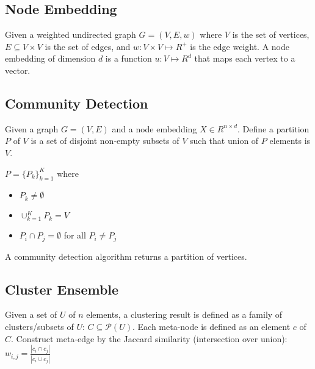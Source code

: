 \subsection{Node Embedding}

\begin{definition}
Given a weighted undirected graph $G = (V, E, w)$ where $V$ is the set of vertices, $E \subseteq V \times V$ is the set of edges, and $w: V \times V \mapsto R^+$ is the edge weight. A node embedding of dimension $d$ is a function $u: V \mapsto R^d$ that maps each vertex to a vector.
\end{definition}



\newpage
\subsection{Community Detection}
\begin{definition}
Given a graph $G = (V, E)$ and a node embedding $X \in R^{n \times d}$. Define a partition $P$ of $V$ is a set of disjoint non-empty subsets of $V$ such that union of $P$ elements is $V$.

$P = \{P_k\}_{k=1}^{K}$ where
\begin{itemize}
\item $P_k \neq \emptyset$
\item $\cup_{k=1}^{K} P_k = V$
\item $P_i \cap P_j = \emptyset$ for all $P_i \neq P_j$
\end{itemize}

A community detection algorithm returns a partition of vertices.
\end{definition}



\newpage
\subsection{Cluster Ensemble}

\begin{definition}
Given a set of $U$ of $n$ elements, a clustering result is defined as a family of clusters/subsets of $U$: $C \subseteq \mathcal{P}(U)$. Each meta-node is defined as an element $c$ of $C$. Construct meta-edge by the Jaccard similarity (intersection over union): $w_{i, j} = \frac{|c_i \cap c_j|}{|c_i \cup c_j|}$
\label{def:meta_graph}
\end{definition}


